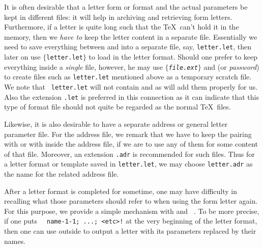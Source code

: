 {It is often desirable that a letter form or format and the actual
parameters be kept in different files: it will help in archiving
and retrieving form letters. Furthermore, if a letter is quite
long such that the \TeX\ can't hold it in the memory, then we
{\sl have to} keep the letter content in a separate file.
Essentially we need to save everything between
{\tt\string\beginletter} and {\tt \string\endletter} into a
separate file, say, {\tt letter.let}, then later on use
{\tt\string{}$\{$letter.let$\}$} to load in the letter
format. Should one prefer to keep everything inside a {\sl single}
file, however, he may use {\tt\string\beginfile [{\it
password}]$\{${\it file.ext}$\}$} and {\tt\string\endfile} (or
{\it password}) to create files such as {\tt letter.let}
mentioned above as a temporary scratch file. We note that {\tt
letter.let} will not contain {\tt\string\beginletter} and
{\tt\string\endletter} as {\tt \string{}} will add them
properly for us. Also the extension {\tt .let} is preferred in
this connection as it can indicate that this type of format file
should not quite be regarded as the normal \TeX\ files.

\medskip

Likewise, it is also desirable to have a separate address or
general letter parameter file. For the address file, we remark
that we have to keep the pairing {\tt \string\beginlinemode} with
{\tt \string\endlinemode} or {\tt\string\beginblockmode} with
{\tt \string\endblockmode} inside the address file, if we are to
use any of them for some content of that file. Moreover, an
extension {\tt .adr} is recommended for such files. Thus for a
letter format or template saved in {\tt letter.let}, we may
choose {\tt letter.adr} as the name for the related address file.

\medskip
After a letter format is completed for sometime, one may have
difficulty in recalling what those parameters should refer to
when using the form letter again. For this purpose, we provide
a simple mechanism with {\tt\string\paranames} and {\tt
\string\showparas}. To be more precise, if one puts {\tt
\string\paranames\ name-1-1; ...; <etc>!} at the very beginning of
the letter format, then one can use {\tt\string\showparas}
outside to output a letter with its parameters replaced by their
names.

\medskip

}
